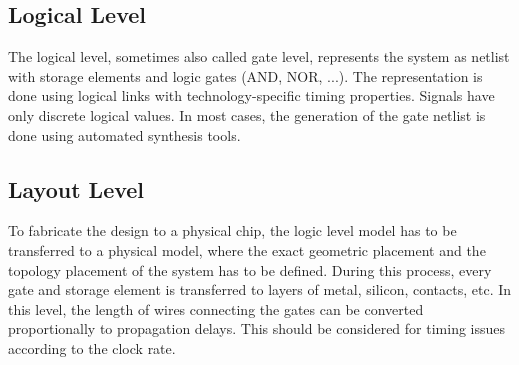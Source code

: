 \subsection{Logical Level}
The logical level, sometimes also called gate level, represents the system as netlist with storage elements and logic gates (AND, NOR, ...). The representation is done using logical links with technology-specific timing properties. Signals have only discrete logical values. In most cases, the generation of the gate netlist is done using automated synthesis tools.
\subsection{Layout Level}
To fabricate the design to a physical chip, the logic level model has to be transferred to a physical model, where the exact geometric placement and the topology placement of the system has to be defined. During this process, every gate and storage element is transferred to layers of metal, silicon, contacts, etc.\cite{Cey96} In this level, the length of wires connecting the gates can be converted proportionally to propagation delays. This should be considered for timing issues according to the clock rate.


